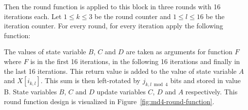 \begin{description}
    Then the round function is applied to this block in three rounds
    with 16 iterations each. Let $1 \leq k \leq 3$ be the round counter
    and $1 \leq l \leq 16$ be the iteration counter. For every round,
    for every iteration apply the following function:

    The values of state variable $B$, $C$ and $D$ are taken as arguments
    for function $F$ where $F$ is  in the first 16 iterations,
     in the following 16 iterations and finally 
    in the last 16 iterations. This return value is added to the value of state
    variable $A$ and $X[i_{k,l}]$. This sum is then left-rotated by
    $j_{k,l \bmod{4}}$ bits and stored in value B. State variables $B$, $C$ and
    $D$ update variables $C$, $D$ and $A$ respectively.
%
    This round function design is visualized in Figure~\ref{fig:md4-round-function}.
\end{description}

